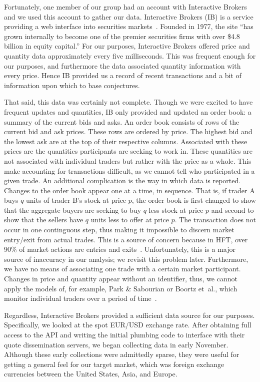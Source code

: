 Fortunately, one member of our group had an account with Interactive Brokers and we used this account to gather our data.
Interactive Brokers (IB) is a service providing a web interface into securities markets~\cite{ib}.
Founded in 1977, the site ``has grown internally to become one of the premier securities firms with over \$4.8 billion in equity capital.''
For our purposes, Interactive Brokers offered price and quantity data approximately every five milliseconds.
This was frequent enough for our purposes, and furthermore the data associated quantity information with every price.
Hence IB provided us a record of recent transactions and a bit of information upon which to base conjectures.

That said, this data was certainly not complete.
Though we were excited to have frequent updates and quantities, IB only provided and updated an order book: a summary of the current bids and asks.
An order book consists of rows of the current bid and ask prices.
These rows are ordered by price. 
The highest bid and the lowest ask are at the top of their respective columns. 
Associated with these prices are the quantities participants are seeking to work in.
These quantities are not associated with individual traders but rather with the price as a whole.
This make accounting for transactions difficult, as we cannot tell who participated in a given trade.
An additional complication is the way in which data is reported. 
Changes to the order book appear one at a time, in sequence.
That is, if trader A buys $q$ units of trader B's stock at price $p$, the order book is first changed to show that the aggregate buyers are seeking to buy $q$ less stock at price $p$ and second to show that the sellers have $q$ units less to offer at price $p$.
The transaction does not occur in one continguous step, thus making it impossible to discern market entry/exit from actual trades.
This is a source of concern because in HFT, over 90\% of market actions are entries and exits~\cite{almgren}. 
Unfortunately, this is a major source of inaccuracy in our analysis; we revisit this problem later.
Furthermore, we have no means of associating one trade with a certain market participant. 
Changes in price and quantity appear without an identifier, thus, we cannot apply the models of, for example, Park \& Sabourian or Boortz et~al., which monitor individual traders over a period of time~\cite{boortz,park2011herding}.

Regardless, Interactive Brokers provided a sufficient data source for our purposes.
Specifically, we looked at the spot EUR/USD exchange rate.
After obtaining full access to the API and writing the initial plumbing code to interface with their quote dissemination servers, we began collecting data in early November.
Although these early collections were admittedly sparse, they were useful for getting a general feel for our target market, which was foreign exchange currencies between the United States, Asia, and Europe.


